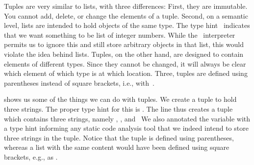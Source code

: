 %
\label{sec:tuples}%
%
%
%
%
%
%
%
%
%
%
Tuples are very similar to lists, with three differences:
First, they are immutable.
You cannot add, delete, or change the elements of a tuple.
Second, on a semantic level, lists are intended to hold objects of the same type.
The type hint~ indicates that we want something to be list of integer numbers.
While the \python\ interpreter permits us to ignore this and still store arbitrary objects in that list, this would violate the idea behind lists.
Tuples, on the other hand, are designed to contain elements of different types.
Since they cannot be changed, it will always be clear which element of which type is at which location.
Three, tuples are defined using parentheses instead of square brackets, i.e., with~\pythonIdx{(\idxdots)}.%
%
%
%
\begin{sloppypar}%
 shows us some of the things we can do with tuples.
We create a tuple  to hold three strings.
The proper type hint for this is .
The line  thus creates a tuple~ which contains three strings, namely , , and~
We also annotated the variable with a type hint informing any static code analysis tool that we indeed intend to store three strings in the tuple.
Notice that the tuple is defined using parentheses, whereas a list with the same content would have been defined using square brackets, e.g., as .%
\end{sloppypar}%
